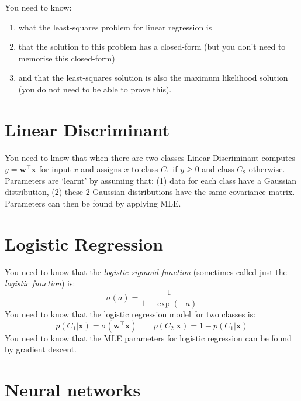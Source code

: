 \documentclass{article}
\newcommand{\yntk}{You need to know}
\begin{document}
\yntk:
\begin{enumerate}
\item what the least-squares problem for linear regression is
\item that the solution to this problem has a closed-form (but you
  don't need to memorise this closed-form)
\item and that the least-squares solution is also the maximum
  likelihood solution (you do not need to be able to prove this).
\end{enumerate}

\section{Linear Discriminant}

\yntk{} that when there are two classes Linear Discriminant
computes $y = \mathbf{w}^{\top}\mathbf{x}$ for input $x$ and assigns
$x$ to class $C_1$ if $y\geq 0$ and class $C_2$ otherwise. Parameters
are `learnt' by assuming that:  (1) data for each class have a Gaussian
distribution, (2) these 2 Gaussian distributions have the same
covariance matrix. Parameters can then be found by applying MLE.

\section{Logistic Regression}
\label{sec:logreg}

\yntk{} that the \emph{logistic sigmoid function} (sometimes
called just the \emph{logistic function}) is:
\[
  \sigma(a) = \frac{1}{1+\exp(-a)}
\]
\yntk{} that the logistic regression model for two classes
is:
\begin{equation}
  \label{eq:logreg}
  p(C_{1}|\mathbf{x}) = \sigma(\mathbf{w}^{\top}\mathbf{x}) \qquad
  p(C_{2}|\mathbf{x}) = 1 - p(C_{1}|\mathbf{x})
\end{equation}
\yntk{} that the MLE parameters for logistic regression can be found by
gradient descent.

\section{Neural networks}
\label{sec:nns}
\end{document}
